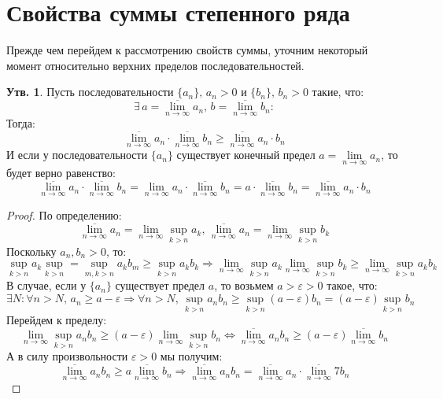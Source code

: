 \documentclass[12pt]{article}
\newcommand{\VE}{\varepsilon}
\theoremstyle{definition}
\newtheorem{prop}{Утв.}
\begin{document}
\section*{Свойства суммы степенного ряда}
Прежде чем перейдем к рассмотрению свойств суммы, уточним некоторый момент относительно верхних пределов последовательностей.
\begin{prop}
	Пусть последовательности $\{a_n\}, \, a_n > 0$ и $\{b_n\}, \, b_n > 0$ такие, что:
	$$
		\exists \, a = \underset{n \to \infty}{\overline{\lim}}a_n, \, b = \underset{n \to \infty}{\overline{\lim}}b_n \colon 
	$$
	Тогда:
	$$
		\underset{n \to \infty}{\overline{\lim}}a_n {\cdot}\underset{n \to \infty}{\overline{\lim}}b_n \geq \underset{n \to \infty}{\overline{\lim}}a_n{\cdot} b_n
	$$
	И если у последовательности $\{a_n\}$ существует конечный предел $a = \lim\limits_{n \to \infty}a_n$, то будет верно равенство:
	$$
		\underset{n \to \infty}{\overline{\lim}}a_n {\cdot}\underset{n \to \infty}{\overline{\lim}}b_n = \lim\limits_{n \to \infty}a_n {\cdot}\underset{n \to \infty}{\overline{\lim}}b_n=  a{\cdot}\underset{n \to \infty}{\overline{\lim}}b_n  = \underset{n \to \infty}{\overline{\lim}}a_n{\cdot} b_n  
	$$
\end{prop}
\begin{proof}
	По определению:
	$$
		\underset{n \to \infty}{\overline{\lim}}a_n = \lim\limits_{n \to \infty}\sup\limits_{k > n} a_k, \, \underset{n \to \infty}{\overline{\lim}}a_n = \lim\limits_{n \to \infty}\sup\limits_{k > n} b_k
	$$
	Поскольку $a_n, b_n > 0$, то:
	$$
		\sup\limits_{k > n}a_k \sup\limits_{k > n} = \sup\limits_{m,k > n}a_k b_m \geq \sup\limits_{k > n} a_k b_k \Rightarrow \lim\limits_{n \to \infty}\sup\limits_{k > n}a_k \lim\limits_{n \to \infty}\sup\limits_{k > n}b_k  \geq \lim\limits_{n \to \infty}\sup\limits_{k > n}a_k b_k
	$$
	В случае, если у $\{a_n\}$ существует предел $a$, то возьмем $a > \VE > 0$ такое, что:
	$$
		\exists N \colon \forall n > N, \, a_n \geq a - \VE \Rightarrow \forall n > N, \, \sup\limits_{k > n} a_n b_n \geq \sup\limits_{k > n}(a - \VE) b_n= (a - \VE)\sup\limits_{k > n} b_n
	$$
	Перейдем к пределу:
	$$
		\lim\limits_{n \to \infty}\sup\limits_{k > n} a_n b_n \geq (a - \VE)\lim\limits_{n \to \infty}\sup\limits_{k > n} b_n  \Leftrightarrow 	\underset{n \to \infty}{\overline{\lim}}a_n b_n \geq (a - \VE)	\underset{n \to \infty}{\overline{\lim}} b_n
	$$
	А в силу произвольности $\VE > 0$ мы получим:
	$$
		\underset{n \to \infty}{\overline{\lim}}a_n b_n \geq a\underset{n \to \infty}{\overline{\lim}} b_n \Rightarrow 	\underset{n \to \infty}{\overline{\lim}}a_n b_n = 	\underset{n \to \infty}{\overline{\lim}}a_n {\cdot}	\underset{n \to \infty}{\overline{\lim}}7b_n
	$$
\end{proof}
\end{document}
